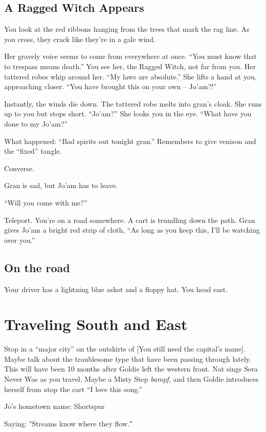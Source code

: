 \begin{multicols}{2}
  \subsection{A Ragged Witch Appears}\label{subsec:scene:ARaggedWitchAppears}

  \begin{aloud}
  You look at the red ribbons hanging from the trees that mark the rag line.
  As you cross, they crack like they're in a gale wind.

  Her gravely voice seems to come from everywhere at once.
  ``You must know that to trespass means death.''
  You see her, the Ragged Witch, not far from you.
  Her tattered robes whip around her.
  ``My laws are absolute.''
  She lifts a hand at you, approaching closer.
  ``You have brought this on your own --
    Jo'am?!''

  Instantly, the winds die down.
  The tattered robe melts into gran's cloak.
  She runs up to you but stops short.
  ``Jo'am?''
  She looks you in the eye.
  ``What have you done to my Jo'am?''
  \end{aloud}

  \begin{aloud}
    What happened:
    ``Bad spirits out tonight gran.''
    Remembers to give venison and the ``fixed'' tangle.
  \end{aloud}


  Converse.

Gran is sad, but Jo'am has to leave.

``Will you come with me?''

Teleport.
You're on a road somewhere.
A cart is trundling down the path.
Gran gives Jo'am a bright red strip of cloth,
``As long as you keep this, I'll be watching over you.''

\subsection{On the road}\label{subsec:scene:OnTheRoad}
  Your driver has a lightning blue askot and a floppy hat.
  You head east.
\end{multicols}

\section{Traveling South and East}

Stop in a ``major city'' on the outskirts of [You still need the capital's name].
Maybe talk about the troublesome type that have been passing through lately.
This will have been 10 months after Goldie left the western front.
Nat sings Sera Never Was as you travel.
Maybe a Misty Step \emph{bampf}, and then Goldie introduces herself from atop the cart
  ``I love this song.''




Jo's hometown name: Shortspur

Saying: "Streams know where they flow."

